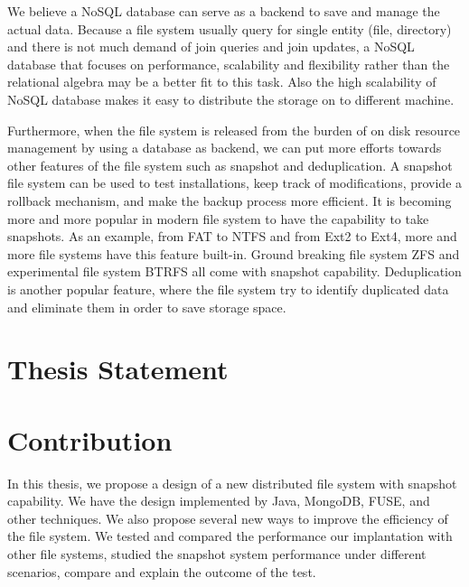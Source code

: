     We believe a NoSQL database can serve as a backend to save and manage the actual data. Because a file system usually query for single entity (file, directory) and there is not much demand of join queries and join updates, a NoSQL database that focuses on performance, scalability and flexibility rather than the relational algebra may be a better fit to this task. Also the high scalability of NoSQL database makes it easy to distribute the storage on to different machine.

    Furthermore, when the file system is released from the burden of on disk resource management by using a database as backend, we can put more efforts towards other features of the file system such as snapshot and deduplication. A snapshot file system can be used to test installations, keep track of modifications, provide a rollback mechanism, and make the backup process more efficient. It is becoming more and more popular in modern file system to have the capability to take snapshots. As an example, from FAT to NTFS and from Ext2 to Ext4, more and more file systems have this feature built-in. Ground breaking file system ZFS and experimental file system BTRFS all come with snapshot capability. Deduplication is another popular feature, where the file system try to identify duplicated data and eliminate them in order to save storage space.

\section{Thesis Statement}


\section{Contribution}

    In this thesis, we propose a design of a new distributed file system with snapshot capability. We have the design implemented by Java, MongoDB, FUSE, and other techniques. We also propose several new ways to improve the efficiency of the file system. We tested and compared the performance our implantation with other file systems, studied the snapshot system performance under different scenarios, compare and explain the outcome of the test.

